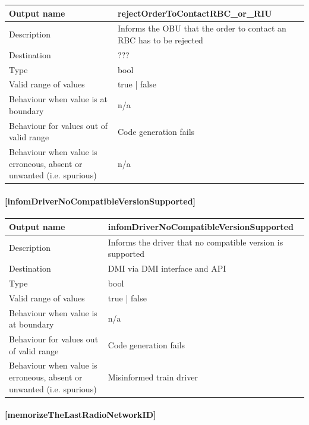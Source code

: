 \begin{longtable}{p{}p{}}
	\toprule
	Output name				& rejectOrderToContactRBC\_or\_RIU \\
	\midrule
	Description				& Informs the OBU that the order to contact an RBC has to be rejected \\
	\midrule
	Destination				& ??? \\ 
	\midrule
	Type					& bool \\
	\midrule
	Valid range of values	& true | false \\
	\midrule
	Behaviour when value is at boundary	& n/a \\
	\midrule
	Behaviour for values out of valid range	& Code generation fails \\
	\midrule
	Behaviour when value is erroneous, absent or unwanted (i.e. spurious) & n/a \\
	\bottomrule
\end{longtable}

\paragraph{[infomDriverNoCompatibleVersionSupported]}

\begin{longtable}{p{}p{}}
	\toprule
	Output name				& infomDriverNoCompatibleVersionSupported \\
	\midrule
	Description				& Informs the driver that no compatible version is supported \\
	\midrule
	Destination				& DMI via DMI interface and API \\ 
	\midrule
	Type					& bool \\
	\midrule
	Valid range of values	& true | false \\
	\midrule
	Behaviour when value is at boundary	& n/a \\
	\midrule
	Behaviour for values out of valid range	& Code generation fails \\
	\midrule
	Behaviour when value is erroneous, absent or unwanted (i.e. spurious) & Misinformed train driver \\
	\bottomrule
\end{longtable}

\paragraph{[memorizeTheLastRadioNetworkID]}

